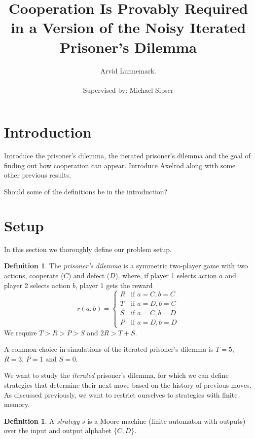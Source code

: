 \documentclass[11pt]{amsart}
\title{Cooperation Is Provably Required in a Version of the Noisy Iterated Prisoner's Dilemma}
\author{Arvid Lunnemark. \\ \\
Supervised by: Michael Sipser}
\theoremstyle{definition}
\newtheorem{definition}[theorem]{Definition}
\theoremstyle{remark}
\begin{document}
\maketitle

\section{Introduction}

Introduce the prisoner's dilemma, the iterated prisoner's dilemma and the goal of finding out how cooperation can appear. Introduce Axelrod along with some other previous results.

Should some of the definitions be in the introduction?


\section{Setup}

In this section we thoroughly define our problem setup.

\begin{definition}
  The \textit{prisoner's dilemma} is a symmetric two-player game with two actions, cooperate ($C$) and defect ($D$), where, if player 1 selects action $a$ and player 2 selects action $b$, player 1 gets the reward
  \begin{equation*}
    r(a,b) = \begin{cases}
      R &\text{if $a = C, b = C$} \\
      T &\text{if $a = D, b = C$} \\
      S &\text{if $a = C, b = D$} \\
      P &\text{if $a = D, b = D$}
    \end{cases}
  \end{equation*}
  We require $T > R > P > S$ and $2R > T + S$.
\end{definition}

A common choice in simulations of the iterated prisoner's dilemma is $T = 5$, $R = 3$, $P = 1$ and $S = 0$.

We want to study the \textit{iterated} prisoner's dilemma, for which we can define strategies that determine their next move based on the history of previous moves. As discussed previously, we want to restrict ourselves to strategies with finite memory.

\begin{definition}
  A \textit{strategy} $s$ is a Moore machine (finite automaton with outputs) over the input and output alphabet $\{C, D\}$. 
\end{definition}
\end{document}
